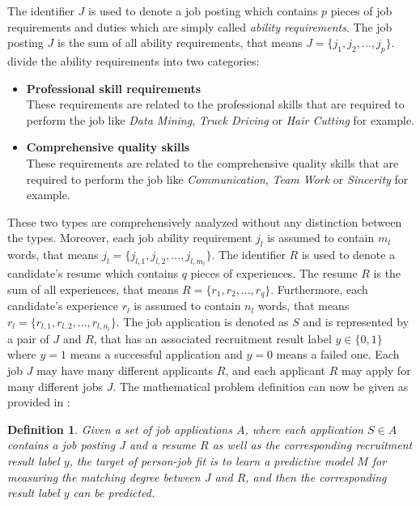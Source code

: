 \documentclass[draft,final]{thesisclass} %
\newtheorem{definition}{Definition}
\begin{document}
The identifier $J$ is used to denote a job posting which contains $p$ pieces of job requirements and duties which are simply called \textit{ability requirements}.
The job posting $J$ is the sum of all ability requirements, that means $J = \{j_1,j_2,...,j_p\}$.
\textcite[7]{pj_fit_ml} divide the ability requirements into two categories:
\begin{itemize}
    \item \textbf{Professional skill requirements}\\
    These requirements are related to the professional skills that are required to perform the job like \textit{Data Mining}, \textit{Truck Driving} or \textit{Hair Cutting} for example.
    \item \textbf{Comprehensive quality skills}\\
    These requirements are related to the comprehensive quality skills that are required to perform the job like \textit{Communication}, \textit{Team Work} or \textit{Sincerity} for example.
\end{itemize}
These two types are comprehensively analyzed without any distinction between the types.
Moreover, each job ability requirement $j_l$ is assumed to contain $m_l$ words, that means $j_l = \{j_{l,1},j_{l,2},...,j_{l,m_l}\}$.
The identifier $R$ is used to denote a candidate's resume which contains $q$ pieces of experiences.
The resume $R$ is the sum of all experiences, that means $R = \{r_1,r_2,...,r_q\}$.
Furthermore, each candidate's experience $r_l$ is assumed to contain $n_l$ words, that means $r_l = \{r_{l,1},r_{l,2},...,r_{l,n_l}\}$.
The job application is denoted as $S$ and is represented by a pair of $J$ and $R$, that has an associated recruitment result label $y \in \{0,1\}$ where $y = 1$ means a successful application and $y = 0$ means a failed one.
Each job $J$ may have many different applicants $R$, and each applicant $R$ may apply for many different jobs $J$.
The mathematical problem definition can now be given as provided in \textcite[8]{pj_fit_ml}:
\begin{definition}
    Given a set of job applications $A$, where each application $S \in A$ contains a job posting $J$ and a resume $R$ as well as the corresponding recruitment result label $y$, the target of person-job fit is to learn a predictive model $M$ for measuring the matching degree between $J$ and $R$, and then the corresponding result label $y$ can be predicted. 
\end{definition}
\end{document}
